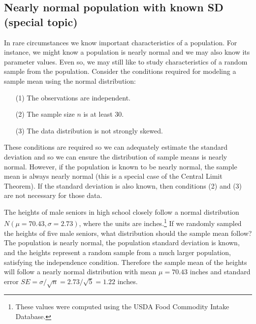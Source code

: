 
\subsection[Nearly normal population with known SD (special topic)]{Nearly normal population with known SD (special topic)}
\label{nearlyNormalPopWithKnownSD}


In rare circumstances we know important characteristics of a population. For instance, we might know a population is nearly normal and we may also know its parameter values. Even so, we may still like to study characteristics of a random sample from the population. Consider the conditions required for modeling a sample mean using the normal distribution:
\begin{enumerate}
\setlength{\itemsep}{0mm}
\item[(1)] The observations are independent.
\item[(2)] The sample size $n$ is at least 30.
\item[(3)] The data distribution is not strongly skewed.
\end{enumerate}
These conditions are required so we can adequately estimate the standard deviation and so we can ensure the distribution of sample means is nearly normal. However, if the population is known to be nearly normal, the sample mean is always nearly normal (this is a special case of the Central Limit Theorem). If the standard deviation is also known, then conditions (2) and (3) are not necessary for those data.

\begin{example}{The heights of male seniors in high school closely follow a normal distribution $N(\mu=70.43, \sigma=2.73)$, where the units are inches.\footnote{These values were computed using the USDA Food Commodity Intake Database.} If we randomly sampled the heights of five male seniors, what distribution should the sample mean follow?}\label{simpleSampleOfFiveMaleSeniors}
The population is nearly normal, the population standard deviation is known, and the heights represent a random sample from a much larger population, satisfying the independence condition. Therefore the sample mean of the heights will follow a nearly normal distribution with mean $\mu=70.43$ inches and standard error $SE=\sigma/\sqrt{n} = 2.73/\sqrt{5}=1.22$ inches.
\end{example}

